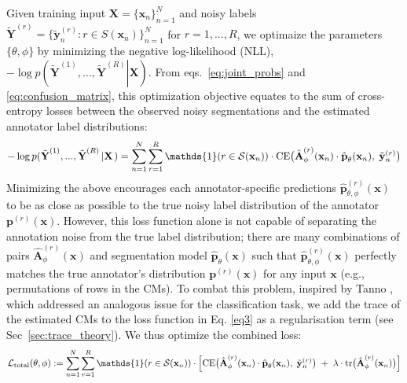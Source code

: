 Given training input $\textbf{X}=\{\textbf{x}_n\}_{n=1}^N$ and noisy labels ${\tilde{\textbf{Y}}^{(r)}} = \{ \tilde{ \textbf{y}}_n^{(r)}: r \in S(\textbf{x}_n)\} _{n = 1}^N$ for $r=1,...,R$, we optimaize the parameters $\{ \theta , \phi \}$ by minimizing the negative log-likelihood (NLL), $ - \log p({\tilde{\textbf{Y}}^{(1)}},...,{\tilde{\textbf{Y}}^{(R)}}\left| \textbf{X} \right.)$. From eqs.~\eqref{eq:joint_probs} and \eqref{eq:confusion_matrix}, this optimization objective equates to the sum of cross-entropy losses between the observed noisy segmentations and the estimated annotator label distributions:
\begin{equation}
    - \log p({\tilde{\textbf{Y}}^{(1)}},...,{\tilde{\textbf{Y}}^{(R)}}\left| \textbf{X} \right.) = \sum\limits_{n = 1}^N {\sum\limits_{r = 1}^R  \mathds{1}(r \in \mathcal{S}({\textbf{x}_n}))}  \cdot
    \text{CE}\big{(}\hat{\textbf{A}}_{\phi}^{(r)}(\textbf{x}_n)\cdot \hat{\textbf{p}}_\theta ({\textbf{x}_n}), \hspace{1mm} \tilde{\textbf{y}}_n^{(r)}\big{)} 
    \label{eq3}
\end{equation}
Minimizing the above encourages each annotator-specific predictions $\hat{\textbf{p}}_{\theta, \phi}^{(r)}(\textbf{x})$ to be as close as possible to the true noisy label distribution of the annotator ${\textbf{p}^{(r)}}(\textbf{x})$. However, this loss function alone is not capable of separating the annotation noise from the true label distribution; there are many combinations of pairs $ {\hat{\textbf{A}}_{\phi}^{(r)}}(\mathbf{x})$ and segmentation model $\hat{\textbf{p}}_\theta(\mathbf{x})$ such that $\hat{\textbf{p}}_{\theta, \phi}^{(r)}(\textbf{x})$ perfectly matches the true annotator's distribution $\textbf{p}^{(r)}(\mathbf{x})$ for any input $\textbf{x}$ (e.g., permutations of rows in the CMs). To combat this problem, inspired by Tanno \etal \cite{tanno2019learning}, which addressed an analogous issue for the classification task, we add the trace of the estimated CMs to the loss function in Eq. \eqref{eq3} as a regularisation term (see Sec~\ref{sec:trace_theory}). We thus optimize the combined loss:
\begin{equation}
    \mathcal{L}_{\text{total}}(\theta, \phi) := \sum\limits_{n = 1}^N {\sum\limits_{r = 1}^R \mathds{1}(r \in \mathcal{S}({\textbf{x}_n}))} \cdot \Big{[} \text{CE}\big{(}\hat{\textbf{A}}_{\phi}^{(r)}(\textbf{x}_n)\cdot \hat{\textbf{p}}_\theta({\textbf{x}_n}),\hspace{1mm} \tilde{\textbf{y}}_n^{(r)}\big{)}\hspace{1mm} + \hspace{1mm}\lambda\cdot \text{tr}\big{(}\hat{\textbf{A}}_{\phi}^{(r)}(\textbf{x}_n)\big{)}\Big{]}
    \label{eq4}
\end{equation}
